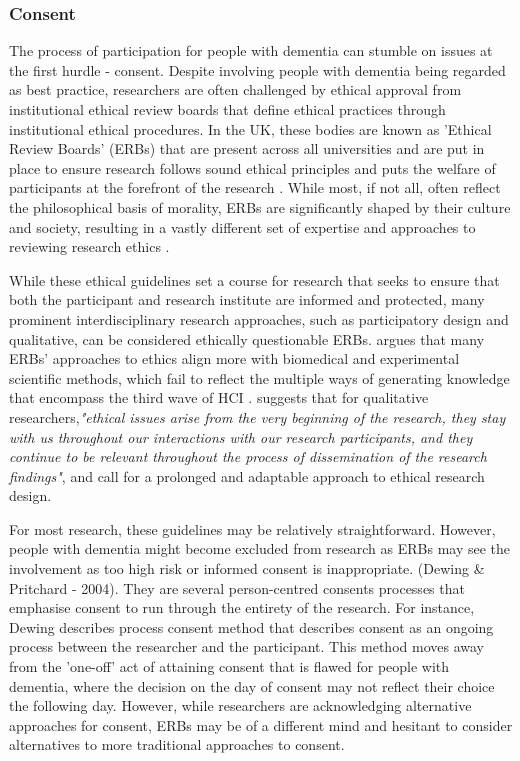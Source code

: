 \subsubsection{Consent}
The process of participation for people with dementia can stumble on issues at the first hurdle - consent. Despite involving people with dementia being regarded as best practice, researchers are often challenged by ethical approval from institutional ethical review boards that define ethical practices through institutional ethical procedures. In the UK, these bodies are known as 'Ethical Review Boards' (ERBs) that are present across all universities and are put in place to ensure research follows sound ethical principles and puts the welfare of participants at the forefront of the research \citep{pachana_can_2014}. While most, if not all, often reflect the philosophical basis of morality, ERBs are significantly shaped by their culture and society, resulting in a vastly different set of expertise and approaches to reviewing research ethics \citep{flicker_ethical_2007}.

While these ethical guidelines set a course for research that seeks to ensure that both the participant and research institute are informed and protected, many prominent interdisciplinary research approaches, such as participatory design and qualitative, can be considered ethically questionable ERBs. \cite{bell_censorship_2014} argues that many ERBs' approaches to ethics align more with biomedical and experimental scientific methods, which fail to reflect the multiple ways of generating knowledge that encompass the third wave of HCI \citep{bodker_when_2006,lazar_critical_2017}. \cite{carla_introducing_2013} suggests that for qualitative researchers,\textit{"ethical issues arise from the very beginning of the research, they stay with us throughout our interactions with our research participants, and they continue to be relevant throughout the process of dissemination of the research findings"}, and call for a prolonged and adaptable approach to ethical research design. 

For most research, these guidelines may be relatively straightforward. However, people with dementia might become excluded from research as ERBs may see the involvement as too high risk or informed consent is inappropriate. (Dewing & Pritchard - 2004). They are several person-centred consents processes that emphasise consent to run through the entirety of the research. For instance, Dewing describes  process consent method that describes consent as an ongoing process between the researcher and the participant. This method moves away from the 'one-off' act of attaining consent that is flawed for people with dementia, where the decision on the day of consent may not reflect their choice the following day. However, while researchers are acknowledging alternative approaches for consent, ERBs may be of a different mind and hesitant to consider alternatives to more traditional approaches to consent.

